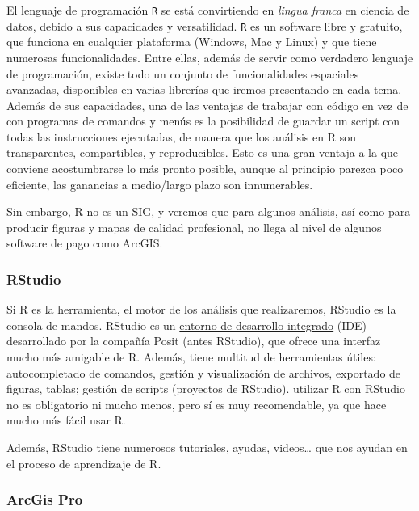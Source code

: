 \documentclass[
  letterpaper,
  DIV=11,
  numbers=noendperiod]{scrreprt}
\begin{document}
El lenguaje de programación \texttt{R} se está convirtiendo en
\emph{lingua franca} en ciencia de datos, debido a sus capacidades y
versatilidad. \texttt{R} es un software
\href{https://cran.r-project.org/bin/windows/base/}{libre y gratuito},
que funciona en cualquier plataforma (Windows, Mac y Linux) y que tiene
numerosas funcionalidades. Entre ellas, además de servir como verdadero
lenguaje de programación, existe todo un conjunto de funcionalidades
espaciales avanzadas, disponibles en varias librerías que iremos
presentando en cada tema. Además de sus capacidades, una de las ventajas
de trabajar con código en vez de con programas de comandos y menús es la
posibilidad de guardar un script con todas las instrucciones ejecutadas,
de manera que los análisis en R son transparentes, compartibles, y
reproducibles. Esto es una gran ventaja a la que conviene acostumbrarse
lo más pronto posible, aunque al principio parezca poco eficiente, las
ganancias a medio/largo plazo son innumerables.

Sin embargo, R no es un SIG, y veremos que para algunos análisis, así
como para producir figuras y mapas de calidad profesional, no llega al
nivel de algunos software de pago como ArcGIS.

\hypertarget{rstudio}{%
\subsubsection*{RStudio}\label{rstudio}}

Si R es la herramienta, el motor de los análisis que realizaremos,
RStudio es la consola de mandos. RStudio es un
\href{https://posit.co/downloads/}{entorno de desarrollo integrado}
(IDE) desarrollado por la compañía Posit (antes RStudio), que ofrece una
interfaz mucho más amigable de R. Además, tiene multitud de herramientas
útiles: autocompletado de comandos, gestión y visualización de archivos,
exportado de figuras, tablas; gestión de scripts (proyectos de RStudio).
utilizar R con RStudio no es obligatorio ni mucho menos, pero sí es muy
recomendable, ya que hace mucho más fácil usar R.

Además, RStudio tiene numerosos tutoriales, ayudas, videos\ldots{} que
nos ayudan en el proceso de aprendizaje de R.

\hypertarget{arcgis-pro}{%
\subsubsection*{ArcGis Pro}\label{arcgis-pro}}
\end{document}
